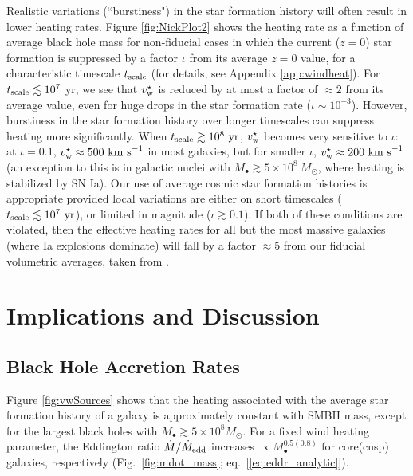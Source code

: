 \documentclass[usenatbib,fleqn]{mn2e}
\begin{document}
Realistic variations (``burstiness") in the star formation history
will often result in lower heating rates.  Figure \ref{fig:NickPlot2}
shows the heating rate as a function of average black hole mass for
non-fiducial cases in which the current ($z = 0$) star formation is
suppressed by a factor $\iota$ from its average $z = 0$ value, for a
characteristic timescale $t_{\rm scale}$ (for details, see Appendix
\ref{app:windheat}).  For $t_{\rm scale} \lesssim 10^{7}$ yr, we see
that $v_{\rm w}^{\star}$ is reduced by at most a factor of $\approx 2$
from its average value, even for huge drops in the star formation rate
($\iota \sim 10^{-3}$).  However, burstiness in the star formation
history over longer timescales can suppress heating more
significantly.  When $t_{\rm scale} \gtrsim 10^8~{\rm yr}$, $v_{\rm
  w}^\star$ becomes very sensitive to $\iota$: at $\iota=0.1$, $v_{\rm
  w}^\star \approx 500~{\rm km~s}^{-1}$ in most galaxies, but for
smaller $\iota$, $v_{\rm w}^\star \approx 200~{\rm km~s}^{-1}$ (an
exception to this is in galactic nuclei with $M_\bullet \gtrsim
5\times 10^8~M_\odot$, where heating is stabilized by SN Ia).  Our use
of average cosmic star formation histories is appropriate provided
local variations are either on short timescales ($t_{\rm scale}
\lesssim 10^7~{\rm yr}$), or limited in magnitude ($\iota \gtrsim
0.1$).  If both of these conditions are violated, then the effective
heating rates for all but the most massive galaxies (where Ia
explosions dominate) will fall by a factor $\approx 5$ from our
fiducial volumetric averages, taken from \citet{MosterNaab+:2013a}.


\section{Implications and Discussion}
\label{sec:discussion}

\subsection{Black Hole Accretion Rates}
\label{sec:mdot}

Figure \ref{fig:vwSources} shows that the heating associated with the
average star formation history of a galaxy is approximately constant
with SMBH mass, except for the largest black holes with $M_{\bullet}
\gtrsim 5\times 10^{8}M_{\odot}$.  For a fixed wind heating parameter,
the Eddington ratio $\dot{M}/\dot{M}_{\rm edd}$ increases $\propto
M_{\bullet}^{0.5(0.8)}$ for core(cusp) galaxies, respectively
(Fig.~\ref{fig:mdot_mass}; eq.~[\ref{eq:eddr_analytic}]).
\end{document}
